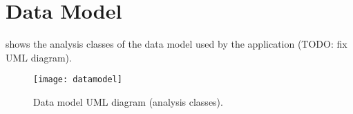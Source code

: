 \chapter{Data Model}\label{ch:datamodel}

 shows the analysis classes of the data model used by the
application (TODO: fix UML diagram).

\begin{figure}[ht]
	\texttt{[image: datamodel]}
	\caption{Data model UML diagram (analysis classes).}\label{fig:datamodel}
\end{figure}





